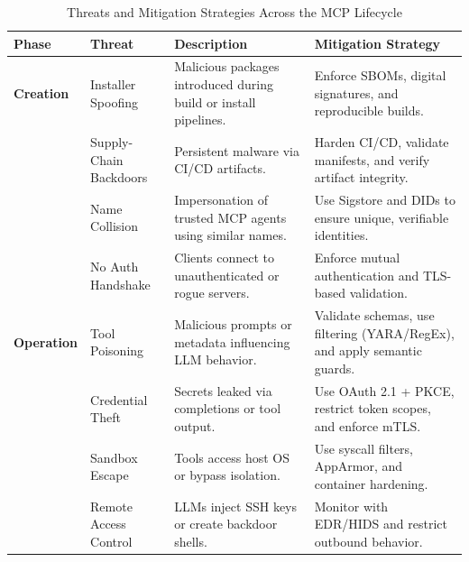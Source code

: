 \documentclass{article}
\begin{document}
\begin{table}[ht]
  \centering
  \renewcommand{\arraystretch}{1.2}
  \captionsetup{justification=centering}
  \caption{Threats and Mitigation Strategies Across the MCP Lifecycle}
  \label{tab:mcp-threats}
\begin{tabularx}{\textwidth}{|
    >{\centering\arraybackslash}p{2.1cm}|
    >{\raggedright\arraybackslash}X|
    >{\raggedright\arraybackslash}X|
    >{\raggedright\arraybackslash}X|}

    \hline
    \rowcolor{gray!30}
    \textbf{Phase} & \textbf{Threat} & \textbf{Description} & \textbf{Mitigation Strategy} \\
    \hline

    \textbf{Creation} 
    & Installer Spoofing 
    & Malicious packages introduced during build or install pipelines.
    & Enforce SBOMs, digital signatures, and reproducible builds. \\

    & Supply-Chain Backdoors 
    & Persistent malware via CI/CD artifacts.
    & Harden CI/CD, validate manifests, and verify artifact integrity. \\

    & Name Collision 
    & Impersonation of trusted MCP agents using similar names.
    & Use Sigstore and DIDs to ensure unique, verifiable identities. \\

    & No Auth Handshake 
    & Clients connect to unauthenticated or rogue servers.
    & Enforce mutual authentication and TLS-based validation. \\

    \hline

    \textbf{Operation} 
    & Tool Poisoning 
    & Malicious prompts or metadata influencing LLM behavior.
    & Validate schemas, use filtering (YARA/RegEx), and apply semantic guards. \\

    & Credential Theft 
    & Secrets leaked via completions or tool output.
    & Use OAuth 2.1 + PKCE, restrict token scopes, and enforce mTLS. \\

    & Sandbox Escape 
    & Tools access host OS or bypass isolation.
    & Use syscall filters, AppArmor, and container hardening. \\

    & Remote Access Control 
    & LLMs inject SSH keys or create backdoor shells.
    & Monitor with EDR/HIDS and restrict outbound behavior. \\


\end{tabularx}
\end{table}
\end{document}
